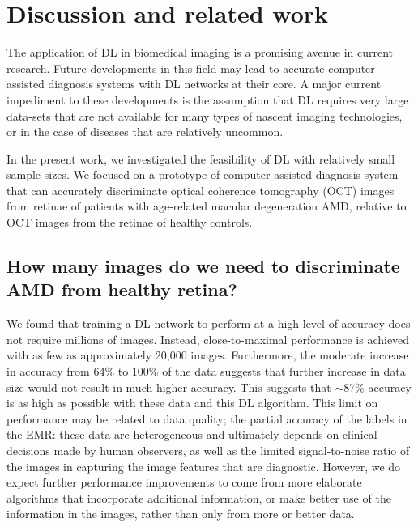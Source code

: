 \section{Discussion and related work}

The application of DL in biomedical imaging is a promising avenue in current
research. Future developments in this field may lead to accurate
computer-assisted diagnosis systems with DL networks at their core.  
A major current impediment to these developments is the assumption that DL 
requires very large data-sets that are not available for many types of nascent 
imaging technologies, or in the case of diseases that are relatively uncommon.

In the present work, we investigated the feasibility of DL with relatively small
sample sizes. We focused on a prototype of computer-assisted diagnosis system
that can accurately discriminate optical coherence tomography (OCT) images from
retinae of patients with age-related macular degeneration AMD, relative to OCT
images from the retinae of healthy controls.

\subsection{How many images do we need to discriminate AMD from healthy retina?}

We found that training a DL network to perform at a high level of accuracy does
not require millions of images. Instead, close-to-maximal performance is
achieved with as few as approximately 20,000 images. Furthermore, the moderate
increase in accuracy from 64\% to 100\% of the data suggests that further
increase in data size would not result in much higher accuracy. This suggests
that $\sim$87\% accuracy is as high as possible with these data and this DL
algorithm. This limit on performance may be related to data quality; the partial
accuracy of the labels in the EMR: these data are heterogeneous and ultimately
depends on clinical decisions made by human observers, as well as the limited
signal-to-noise ratio of the images in capturing the image features that are
diagnostic. However, we do expect further performance improvements to come from
more elaborate algorithms that incorporate additional information, or make
better use of the information in the images, rather than only from more or
better data.

